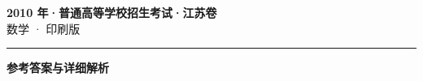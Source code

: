 \documentclass[zihao=5, a4paper]{ctexart}
\begin{document}
\begin{center}
  {\Large\bfseries 2010 年·普通高等学校招生考试·江苏卷}\\[4pt]
  {\large 数学 · 印刷版}
\end{center}
\medskip
{}

\par\bigskip\hrule\bigskip
{}
\begin{center}{\large\bfseries 参考答案与详细解析}\end{center}
\smallskip

\end{document}
